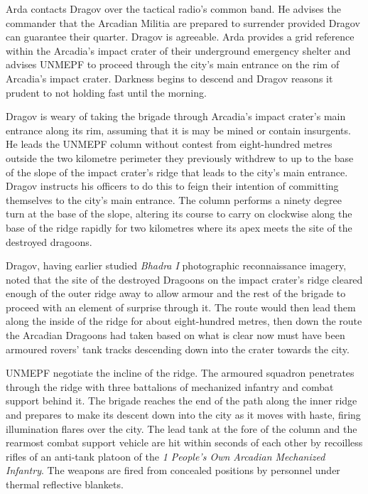 Arda contacts Dragov over the tactical radio's common band. He advises the commander that the Arcadian Militia are prepared to surrender provided Dragov can guarantee their quarter. Dragov is agreeable. Arda provides a grid reference within the Arcadia's impact crater of their underground emergency shelter and advises UNMEPF to proceed through the city's main entrance on the rim of Arcadia's impact crater. Darkness begins to descend and Dragov reasons it prudent to not holding fast until the morning.

Dragov is weary of taking the brigade through Arcadia's impact crater's main entrance along its rim, assuming that it is may be mined or contain insurgents. He leads the UNMEPF column without contest from eight-hundred metres outside the two kilometre perimeter they previously withdrew to up to the base of the slope of the impact crater's ridge that leads to the city's main entrance. Dragov instructs his officers to do this to feign their intention of committing themselves to the city's main entrance. The column performs a ninety degree turn at the base of the slope, altering its course to carry on clockwise along the base of the ridge rapidly for two kilometres where its apex meets the site of the destroyed dragoons.

Dragov, having earlier studied {\it Bhadra I} photographic reconnaissance imagery, noted that the site of the destroyed Dragoons on the impact crater's ridge cleared enough of the outer ridge away to allow armour and the rest of the brigade to proceed with an element of surprise through it. The route would then lead them along the inside of the ridge for about eight-hundred metres, then down the route the Arcadian Dragoons had taken based on what is clear now must have been armoured rovers' tank tracks descending down into the crater towards the city.

UNMEPF negotiate the incline of the ridge. The armoured squadron penetrates through the ridge with three battalions of mechanized infantry and combat support behind it. The brigade reaches the end of the path along the inner ridge and prepares to make its descent down into the city as it moves with haste, firing illumination flares over the city. The lead tank at the fore of the column and the rearmost combat support vehicle are hit within seconds of each other by recoilless rifles of an anti-tank platoon of the {\it 1 People's Own Arcadian Mechanized Infantry}. The weapons are fired from concealed positions by personnel under thermal reflective blankets.
\StopTimelineDate

